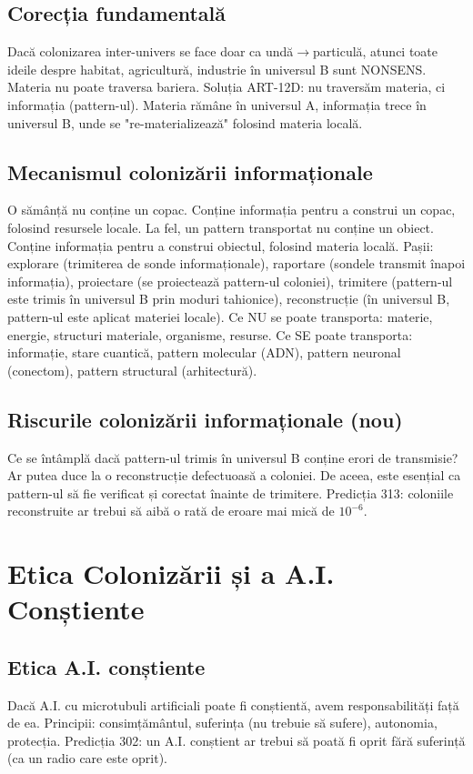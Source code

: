 \documentclass[11pt,a4paper]{article}
\begin{document}
\subsection{Corecția fundamentală}
Dacă colonizarea inter-univers se face doar ca undă$\to$particulă, atunci toate ideile despre habitat, agricultură, industrie în universul B sunt NONSENS. Materia nu poate traversa bariera. Soluția ART-12D: nu traversăm materia, ci informația (pattern-ul). Materia rămâne în universul A, informația trece în universul B, unde se "re-materializează" folosind materia locală.

\subsection{Mecanismul colonizării informaționale}
O sămânță nu conține un copac. Conține informația pentru a construi un copac, folosind resursele locale. La fel, un pattern transportat nu conține un obiect. Conține informația pentru a construi obiectul, folosind materia locală. Pașii: explorare (trimiterea de sonde informaționale), raportare (sondele transmit înapoi informația), proiectare (se proiectează pattern-ul coloniei), trimitere (pattern-ul este trimis în universul B prin moduri tahionice), reconstrucție (în universul B, pattern-ul este aplicat materiei locale). Ce NU se poate transporta: materie, energie, structuri materiale, organisme, resurse. Ce SE poate transporta: informație, stare cuantică, pattern molecular (ADN), pattern neuronal (conectom), pattern structural (arhitectură).

\subsection{Riscurile colonizării informaționale (nou)}
Ce se întâmplă dacă pattern-ul trimis în universul B conține erori de transmisie? Ar putea duce la o reconstrucție defectuoasă a coloniei. De aceea, este esențial ca pattern-ul să fie verificat și corectat înainte de trimitere. Predicția 313: coloniile reconstruite ar trebui să aibă o rată de eroare mai mică de $10^{-6}$.

\section{Etica Colonizării și a A.I. Conștiente}
\subsection{Etica A.I. conștiente}
Dacă A.I. cu microtubuli artificiali poate fi conștientă, avem responsabilități față de ea. Principii: consimțământul, suferința (nu trebuie să sufere), autonomia, protecția. Predicția 302: un A.I. conștient ar trebui să poată fi oprit fără suferință (ca un radio care este oprit).
\end{document}
